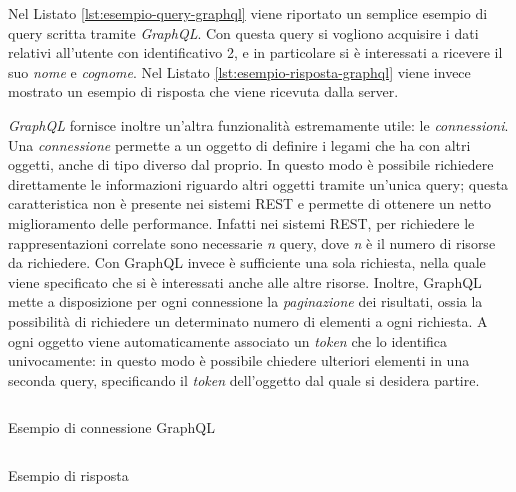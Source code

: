 Nel Listato \ref{lst:esempio-query-graphql} viene riportato un semplice esempio di query scritta tramite \emph{GraphQL}. Con questa query si vogliono acquisire i dati relativi all'utente con identificativo 2, e in particolare si è interessati a ricevere il suo \emph{nome} e \emph{cognome}. Nel Listato \ref{lst:esempio-risposta-graphql} viene invece mostrato un esempio di risposta che viene ricevuta dalla server.

\emph{GraphQL} fornisce inoltre un'altra funzionalità estremamente utile: le \emph{connessioni}. Una \emph{connessione} permette a un oggetto di definire i legami che ha con altri oggetti, anche di tipo diverso dal proprio. In questo modo è possibile richiedere direttamente le informazioni riguardo altri oggetti tramite un'unica query; questa caratteristica non è presente nei sistemi REST e permette di ottenere un netto miglioramento delle performance. Infatti nei sistemi REST, per richiedere le rappresentazioni correlate sono necessarie \emph{n} query, dove \emph{n} è il numero di risorse da richiedere. Con GraphQL invece è sufficiente una sola richiesta, nella quale viene specificato che si è interessati anche alle altre risorse. Inoltre, GraphQL mette a disposizione per ogni connessione la \emph{paginazione} dei risultati, ossia la possibilità di richiedere un determinato numero di elementi a ogni richiesta. A ogni oggetto viene automaticamente associato un \emph{token} che lo identifica univocamente: in questo modo è possibile chiedere ulteriori elementi in una seconda query, specificando il \emph{token} dell'oggetto dal quale si desidera partire.

\begin{center}
	\hspace*{-1.5cm}
	\begin{minipage}[t]{0.63\textwidth}
		\begin{listing}[H]
			\inputminted{text}{2-nozioni-preliminari/Codice/esempio_connessione_graphql.graphql}
			\caption{Esempio di connessione GraphQL}
			\label{lst:esempio-connessione-graphql}
		\end{listing}
	\end{minipage}%
	\begin{minipage}[t]{0.63\textwidth}
		\begin{listing}[H]
			\inputminted{json}{2-nozioni-preliminari/Codice/esempio_risposta_connessione_graphql.json}
			\caption{Esempio di risposta}
			\label{lst:esempio-risposta-connessione-graphql}
		\end{listing}
	\end{minipage}	
\end{center}

